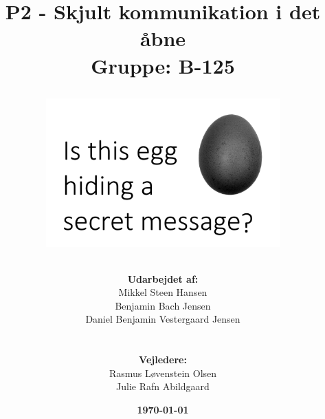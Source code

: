 \documentclass[11pt]{article}
\title{
    P2 - Skjult kommunikation i det åbne 
    \\ 
    Gruppe: B-125
    \\
    \begin{figure}[!h]
        \centering
        \includegraphics[width=0.8\textwidth, angle =0]{Projectdoc/Assets/Illustrationer/egg-front.png}
        \label{fig:FrontPage}
    \end{figure}
}
\author{
    \textbf{Udarbejdet af:}\\
    Mikkel Steen Hansen\\
    Benjamin Bach Jensen\\
    Daniel Benjamin Vestergaard Jensen\\
    \\\\
    \textbf{Vejledere:}\\ 
    Rasmus Løvenstein Olsen\\
    Julie Rafn Abildgaard\\
}
\date{\textbf{\today}}
\renewcommand{\baselinestretch}{1.20}
\begin{document}
    \begin{titlepage}
        \clearpage
        \maketitle
        \thispagestyle{empty}
    \end{titlepage}
    
    
    
    \renewcommand{\baselinestretch}{0.8} 
    \tableofcontents
    \renewcommand{\baselinestretch}{1.20} 
    \newpage
    
    
    
    
    
    
    
    
    
    
    \newpage
    
    
    \newpage
    
    
    
    
    
    
    
    
    
    \newpage
    
    
    \newpage
    
    
    
    
    
\end{document}
